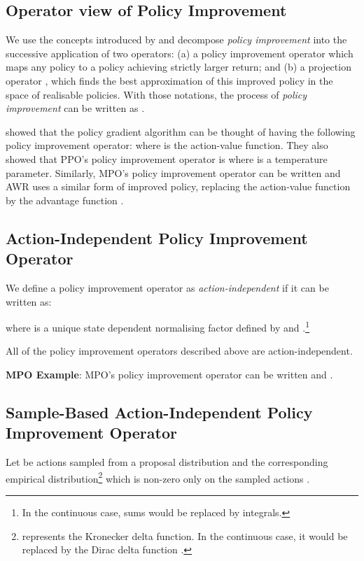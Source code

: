 \documentclass{article}
\begin{document}
\subsection{Operator view of Policy Improvement}
\label{operator-view}
We use the concepts introduced by \cite{ghosh2020operator} and decompose \emph{policy improvement} into the successive application of two operators: (a) a policy improvement operator  which maps any policy to a policy achieving strictly larger return; and (b) a projection operator , which finds the best approximation of this improved policy in the space of realisable policies. With those notations, the process of \emph{policy improvement} can be written as .

\cite{ghosh2020operator} showed that the policy gradient algorithm can be thought of having the following policy improvement operator:  where  is the action-value function. They also showed that PPO's \cite{schulman2017proximal} policy improvement operator is  where  is a temperature parameter. Similarly, MPO's \cite{mpo} policy improvement operator can be written  and AWR \cite{peng2019advantage} uses a similar form of improved policy, replacing the action-value function by the advantage function .


\subsection{Action-Independent Policy Improvement Operator}
\label{action-indep}
We define a policy improvement operator as \emph{action-independent} if it can be written as:

where  is a unique state dependent normalising factor defined by  and .\footnote{In the continuous case, sums would be replaced by integrals.}

All of the policy improvement operators described above are action-independent.

\textbf{MPO Example}: MPO's policy improvement operator can be written  and .


\subsection{Sample-Based Action-Independent Policy Improvement Operator}
Let  be  actions sampled from a proposal distribution  and  the corresponding empirical distribution\footnote{ represents the Kronecker delta function. In the continuous case, it would be replaced by the Dirac delta function .} which is non-zero only on the sampled actions .
\end{document}
